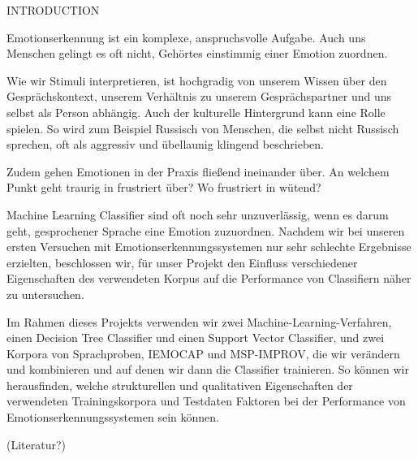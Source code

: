 INTRODUCTION


Emotionserkennung ist ein komplexe, anspruchsvolle Aufgabe. Auch uns Menschen gelingt es oft nicht, Gehörtes einstimmig einer Emotion zuordnen. 

Wie wir Stimuli interpretieren, ist hochgradig von unserem Wissen über den Gesprächskontext, unserem Verhältnis zu unserem Gesprächspartner und uns selbst als Person abhängig. Auch der kulturelle Hintergrund kann eine Rolle spielen. So wird zum Beispiel Russisch von Menschen, die selbst nicht Russisch sprechen, oft als aggressiv und übellaunig klingend beschrieben. 

Zudem gehen Emotionen in der Praxis fließend ineinander über. An welchem Punkt geht traurig in frustriert über? Wo frustriert in wütend? 

Machine Learning Classifier sind oft noch sehr unzuverlässig, wenn es darum geht, gesprochener Sprache eine Emotion zuzuordnen. Nachdem wir bei unseren ersten Versuchen mit Emotionserkennungssystemen nur sehr schlechte Ergebnisse erzielten, beschlossen wir, für unser Projekt den Einfluss verschiedener Eigenschaften des verwendeten Korpus auf die Performance von Classifiern näher zu untersuchen. 

Im Rahmen dieses Projekts verwenden wir zwei Machine-Learning-Verfahren, einen Decision Tree Classifier und einen Support Vector Classifier, und zwei Korpora von Sprachproben, IEMOCAP und MSP-IMPROV, die wir verändern und kombinieren und auf denen wir dann die Classifier trainieren. So können wir herausfinden, welche strukturellen und qualitativen Eigenschaften der verwendeten Trainingskorpora und Testdaten Faktoren bei der Performance von Emotionserkennungssystemen sein können. 

(Literatur?)


